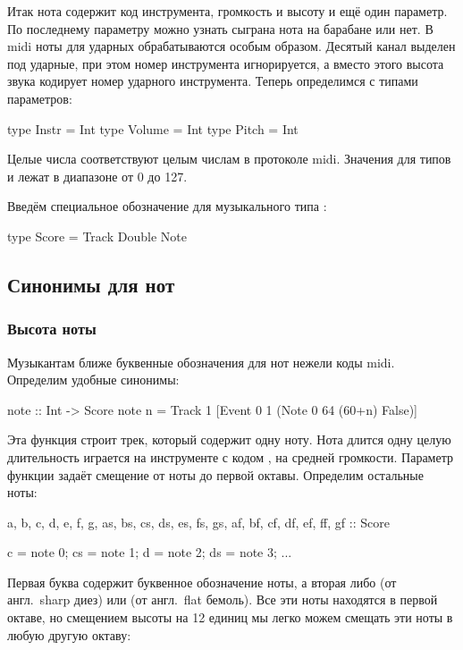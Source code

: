 Итак нота содержит код инструмента, громкость
и высоту и ещё один параметр. По последнему параметру
можно узнать сыграна нота на барабане или нет. 
В midi ноты для ударных обрабатываются особым образом. 
Десятый канал выделен под ударные, при этом номер
инструмента игнорируется, а вместо этого высота звука
кодирует номер ударного инструмента. 
Теперь определимся с типами параметров:

\begin{code}
type Instr  = Int
type Volume = Int
type Pitch  = Int
\end{code}

Целые числа соответствуют целым числам в протоколе midi.
Значения для типов  и  лежат
в диапазоне от 0 до 127.

Введём специальное обозначение для музыкального типа :

\begin{code}
type Score = Track Double Note
\end{code}

\subsection{Синонимы для нот}

\subsubsection{Высота ноты}

Музыкантам ближе буквенные обозначения для нот нежели
коды midi. Определим удобные синонимы:

\begin{code}
note :: Int -> Score
note n = Track 1 [Event 0 1 (Note 0 64 (60+n) False)]
\end{code}

Эта функция строит трек, который содержит одну ноту. 
Нота длится одну целую длительность играется на инструменте 
с кодом , на средней громкости. Параметр функции
задаёт смещение от ноты до первой октавы. Определим 
остальные ноты:

\begin{code}
a, b, c, d, e, f, g,
    as, bs, cs, ds, es, fs, gs,
    af, bf, cf, df, ef, ff, gf :: Score

c = note 0;    cs = note 1;    d = note 2;    ds = note 3;	
...
\end{code}

Первая буква содержит буквенное обозначение ноты, а вторая
либо  (от англ.~sharp диез) или  (от англ.~flat бемоль).
Все эти ноты находятся в первой октаве, но смещением высоты
на 12 единиц мы легко можем смещать эти ноты в любую другую октаву:


